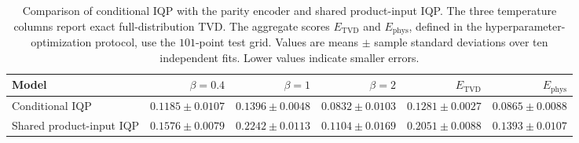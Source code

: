 \begin{table}[t]
\centering
\small
\caption{Comparison of conditional IQP with the parity encoder and shared product-input IQP. The three temperature columns report exact full-distribution TVD. The aggregate scores $E_{\mathrm{TVD}}$ and $E_{\mathrm{phys}}$, defined in the hyperparameter-optimization protocol, use the $101$-point test grid. Values are means $\pm$ sample standard deviations over ten independent fits. Lower values indicate smaller errors.}
\label{tab:cw_product_ablation}
\begin{tabular}{lrrrrr}
\toprule
Model & $\beta=0.4$ & $\beta=1$ & $\beta=2$ & $E_{\mathrm{TVD}}$ & $E_{\mathrm{phys}}$ \\
\midrule
Conditional IQP & $0.1185\pm0.0107$ & $0.1396\pm0.0048$ & $0.0832\pm0.0103$ & $0.1281\pm0.0027$ & $0.0865\pm0.0088$ \\
Shared product-input IQP & $0.1576\pm0.0079$ & $0.2242\pm0.0113$ & $0.1104\pm0.0169$ & $0.2051\pm0.0088$ & $0.1393\pm0.0107$ \\
\bottomrule
\end{tabular}
\end{table}
